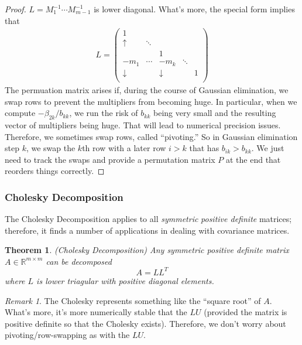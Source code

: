 \documentclass[12pt]{article}
\numberwithin{equation}{section} %
\theoremstyle{plain}
\newtheorem{thm}{Theorem}[section]
\theoremstyle{definition}
\theoremstyle{remark}
\newtheorem*{rmk}{Remark}
\newcommand{\Rmm}{\mathbb{R}^{m\times m}}
\begin{document}
\begin{proof}
$L=M_1^{-1}\cdots M_{m-1}^{-1}$ is lower diagonal. What's more, the
special form implies that
\begin{align*}
  L=
  \begin{pmatrix}
    1 & &\\
    \uparrow& \ddots &\\
     & & 1 \\
    -m_1 & \cdots & -m_k &\ddots \\
    \downarrow & & \downarrow & & 1 \\
  \end{pmatrix}
\end{align*}
The permuation matrix arises if, during the course of Gaussian
elimination, we swap rows to prevent the multipliers from becoming huge.
In particular, when we compute $-\beta_{2k}/b_{kk}$, we run the risk of
$b_{kk}$ being very small and the resulting vector of multipliers being
huge. That will lead to numerical precision issues. Therefore, we
sometimes swap rows, called ``pivoting.'' So in Gaussian elimination
step $k$, we swap the $k$th row with a later row $i>k$ that has
$b_{ik}>b_{kk}$. We just need to track the swaps and provide a
permutation matrix $P$ at the end that reorders things correctly.
\end{proof}


\clearpage
\subsubsection{Cholesky Decomposition}

The Cholesky Decomposition applies to all \emph{symmetric}
\emph{positive definite} matrices; therefore, it finds a number of
applications in dealing with covariance matrices.

\begin{thm}\emph{(Cholesky Decomposition)}
Any symmetric positive definite matrix $A\in\Rmm$ can be
decomposed
\begin{equation}
  A = L L^T
\end{equation}
where $L$ is lower triagular with positive diagonal elements.
\end{thm}

\begin{rmk}
The Cholesky represents something like the ``square root'' of $A$.
What's more, it's more numerically stable that the $LU$ (provided the
matrix is positive definite so that the Cholesky exists). Therefore, we
don't worry about pivoting/row-swapping as with the $LU$.
\end{rmk}
\end{document}
